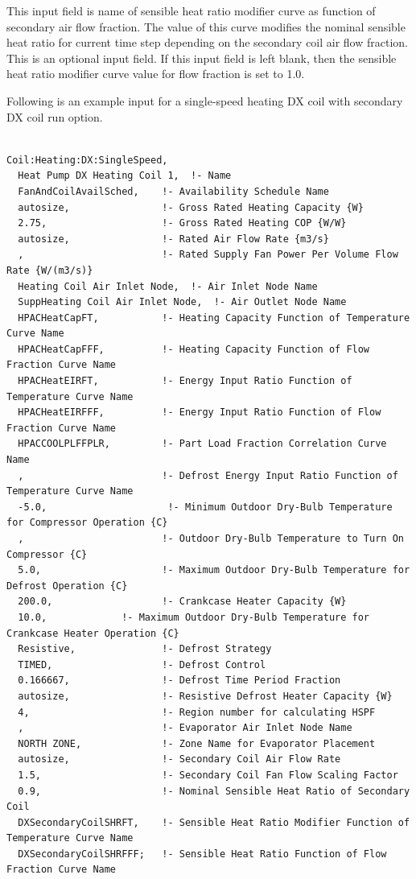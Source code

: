This input field is name of sensible heat ratio modifier curve as function of secondary air flow fraction. The value of this curve modifies the nominal sensible heat ratio for current time step depending on the secondary coil air flow fraction. This is an optional input field. If this input field is left blank, then the sensible heat ratio modifier curve value for flow fraction is set to 1.0.

Following is an example input for a single-speed heating DX coil with secondary DX coil run option.

\begin{lstlisting}

Coil:Heating:DX:SingleSpeed,
  Heat Pump DX Heating Coil 1,  !- Name
  FanAndCoilAvailSched,    !- Availability Schedule Name
  autosize,                !- Gross Rated Heating Capacity {W}
  2.75,                    !- Gross Rated Heating COP {W/W}
  autosize,                !- Rated Air Flow Rate {m3/s}
  ,                        !- Rated Supply Fan Power Per Volume Flow Rate {W/(m3/s)}
  Heating Coil Air Inlet Node,  !- Air Inlet Node Name
  SuppHeating Coil Air Inlet Node,  !- Air Outlet Node Name
  HPACHeatCapFT,           !- Heating Capacity Function of Temperature Curve Name
  HPACHeatCapFFF,          !- Heating Capacity Function of Flow Fraction Curve Name
  HPACHeatEIRFT,           !- Energy Input Ratio Function of Temperature Curve Name
  HPACHeatEIRFFF,          !- Energy Input Ratio Function of Flow Fraction Curve Name
  HPACCOOLPLFFPLR,         !- Part Load Fraction Correlation Curve Name
  ,                        !- Defrost Energy Input Ratio Function of Temperature Curve Name
  -5.0,                     !- Minimum Outdoor Dry-Bulb Temperature for Compressor Operation {C}
  ,                        !- Outdoor Dry-Bulb Temperature to Turn On Compressor {C}
  5.0,                     !- Maximum Outdoor Dry-Bulb Temperature for Defrost Operation {C}
  200.0,                   !- Crankcase Heater Capacity {W}
  10.0,             !- Maximum Outdoor Dry-Bulb Temperature for Crankcase Heater Operation {C}
  Resistive,               !- Defrost Strategy
  TIMED,                   !- Defrost Control
  0.166667,                !- Defrost Time Period Fraction
  autosize,                !- Resistive Defrost Heater Capacity {W}
  4,                       !- Region number for calculating HSPF
  ,                        !- Evaporator Air Inlet Node Name
  NORTH ZONE,              !- Zone Name for Evaporator Placement
  autosize,                !- Secondary Coil Air Flow Rate
  1.5,                     !- Secondary Coil Fan Flow Scaling Factor
  0.9,                     !- Nominal Sensible Heat Ratio of Secondary Coil
  DXSecondaryCoilSHRFT,    !- Sensible Heat Ratio Modifier Function of Temperature Curve Name
  DXSecondaryCoilSHRFFF;   !- Sensible Heat Ratio Function of Flow Fraction Curve Name
\end{lstlisting}

